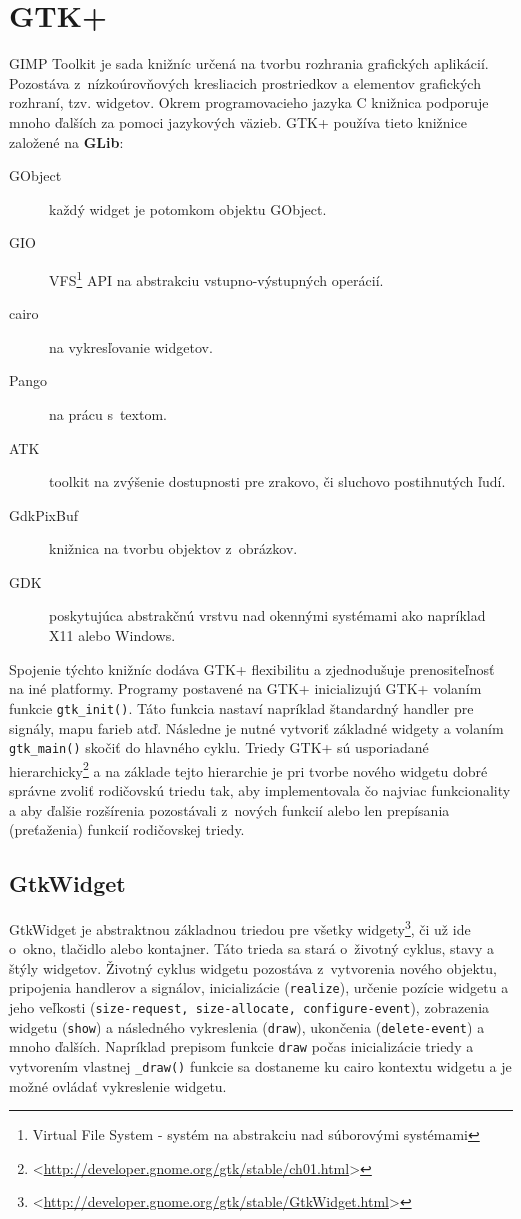\documentclass[12pt,oneside,final]{fithesis2}
\begin{document}
\section{GTK+}
GIMP Toolkit je sada knižníc určená na tvorbu rozhrania grafických aplikácií. Pozostáva z~nízkoúrovňových kresliacich prostriedkov a elementov grafických rozhraní, tzv. widgetov. Okrem programovacieho jazyka C knižnica podporuje mnoho ďalších za pomoci jazykových väzieb. GTK+ používa tieto knižnice založené na \textbf{GLib}:
\begin{description}
\item[GObject] každý widget je potomkom objektu GObject.
\item[GIO] VFS\footnote{Virtual File System - systém na abstrakciu nad súborovými systémami} API na abstrakciu vstupno-výstupných operácií.
\item[cairo] na vykresľovanie widgetov.
\item[Pango] na prácu s~textom.
\item[ATK] toolkit na zvýšenie dostupnosti pre zrakovo, či sluchovo postihnutých ľudí.
\item[GdkPixBuf] knižnica na tvorbu objektov z~obrázkov.
\item[GDK] poskytujúca abstrakčnú vrstvu nad okennými systémami ako napríklad X11 alebo Windows.
\end{description}
Spojenie týchto knižníc dodáva GTK+ flexibilitu a zjednodušuje prenositeľnosť na iné platformy.
Programy postavené na GTK+ inicializujú GTK+ volaním funkcie \texttt{gtk\_\-init()}. Táto funkcia nastaví napríklad štandardný handler pre signály, mapu farieb atď. Následne je nutné vytvoriť základné widgety a volaním \texttt{gtk\_\-main()} skočiť do hlavného cyklu. Triedy GTK+ sú usporiadané hierarchicky\footnote{<\url{http://developer.gnome.org/gtk/stable/ch01.html}>} a na základe tejto hierarchie je pri tvorbe nového widgetu dobré správne zvoliť rodičovskú triedu tak, aby implementovala čo najviac funkcionality a aby ďalšie rozšírenia pozostávali z~nových funkcií alebo len prepísania (preťaženia) funkcií rodičovskej triedy.
\subsection{GtkWidget}
GtkWidget je abstraktnou základnou triedou pre všetky widgety\footnote{<\url{http://developer.gnome.org/gtk/stable/GtkWidget.html}>}, či už ide o~okno, tlačidlo alebo kontajner. Táto trieda sa stará o~životný cyklus, stavy a štýly widgetov. Životný cyklus widgetu pozostáva z~vytvorenia nového objektu, pripojenia handlerov a signálov, inicializácie (\texttt{realize}), určenie pozície widgetu a jeho veľkosti (\texttt{size-request, size-allocate, configure-event}), zobrazenia widgetu (\texttt{show}) a následného vykreslenia (\texttt{draw}), ukončenia (\texttt{delete-event}) a mnoho ďalších. Napríklad prepisom funkcie \texttt{draw} počas inicializácie triedy a vytvorením vlastnej \texttt{\_\-draw()} funkcie sa dostaneme ku cairo kontextu widgetu a je možné ovládať vykreslenie widgetu.
\end{document}
